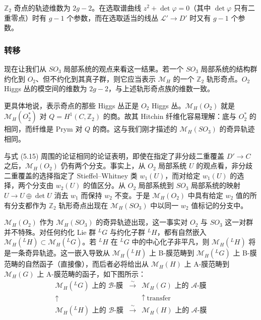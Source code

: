 \documentclass[11pt,a4paper]{article}
\begin{document}
$\mathbb{Z}_2$ 奇点的轨迹维数为 $2g-2$。在选取谱曲线 $z^2+\det\varphi = 0$（其中 $\det\varphi$ 只有二重零点）时有 $g-1$ 个参数，而在选取适当的线丛 $\mathcal{L}'\to D'$ 时又有 $g-1$ 个参数。


\subsubsection{转移}

现在让我们从 $SO_3$ 局部系统的观点来看这一结果。若一个 $SO_3$ 局部系统的结构群约化到 $O_2$、但不约化到其真子群，则它应当表示 $\mathcal{M}_H$ 的一个 $\mathbb{Z}_2$ 轨形奇点。$O_2$ Higgs 丛的模空间的维数为 $2g-2$，与上述轨形奇点族的维数一致。

更具体地说，表示奇点的那些 Higgs 丛正是 $O_2$ Higgs 丛。$\mathcal{M}_H(O_2)$ 就是 $\mathcal{M}_H(O_2^*)$ 对 $Q = H^1(C,\mathbb{Z}_2)$ 的商。故其 Hitchin 纤维化容易理解：底与 $O_2^*$ 的相同，而纤维是 Prym 对 $Q$ 的商。这与我们刚才描述的 $\mathcal{M}_H(SO_3)$ 的奇异轨迹相同。

与式 (5.15) 周围的论证相同的论证表明，即使在指定了非分歧二重覆盖 $D'\to C$ 之后，$\mathcal{M}_H(O_2)$ 仍有两个分支。事实上，从 $O_2$ 局部系统 $U$ 的观点看，非分歧二重覆盖的选择指定了 Stieffel--Whitney 类 $w_1(U)$，而对给定 $w_1(U)$ 的选择，两个分支由 $w_2(U)$ 的值区分。从 $O_2$ 局部系统到 $SO_3$ 局部系统的映射 $U\to U\oplus\det U$ 消去 $w_1$ 而保持 $w_2$ 不变。于是 $\mathcal{M}_H(O_2)$ 中具有给定 $w_2$ 值的所有分支都作为 $\mathbb{Z}_2$ 轨形奇点出现在 $\mathcal{M}_H(SO_3)$ 中以同一 $w_2$ 值标记的分支中。

$\mathcal{M}_H(O_2)$ 作为 $\mathcal{M}_H(SO_3)$ 的奇异轨迹出现，这一事实对 $O_2$ 与 $SO_3$ 这一对群并不特殊。对任何约化 Lie 群 ${}^{L}G$ 与约化子群 ${}^{L}H$，都有自然嵌入 $\mathcal{M}_H({}^{L}H)\subset\mathcal{M}_H({}^{L}G)$。若 ${}^{L}H$ 在 ${}^{L}G$ 中的中心化子非平凡，则 $\mathcal{M}_H({}^{L}H)$ 将是一条奇异轨迹。这一嵌入导致从 $\mathcal{M}_H({}^{L}H)$ 上 B-膜范畴到 $\mathcal{M}_H({}^{L}G)$ 上 B-膜范畴的自然函子（直接像），而后者必将给出从 $\mathcal{M}_H(H)$ 上 A-膜范畴到 $\mathcal{M}_H(G)$ 上 A-膜范畴的函子，如下图所示：
\[
\begin{array}{ccc}
\mathcal{M}_H({}^{L}G)\text{ 上的 }\mathcal{B}\text{-膜} & \xrightarrow{\ \sim\ } & \mathcal{M}_H(G)\text{ 上的 }\mathcal{A}\text{-膜}\\[10pt]
\uparrow & & \uparrow\ \text{transfer}\\[10pt]
\mathcal{M}_H({}^{L}H)\text{ 上的 }\mathcal{B}\text{-膜} & \xrightarrow{\ \sim\ } & \mathcal{M}_H(H)\text{ 上的 }\mathcal{A}\text{-膜}
\end{array}
\]
\end{document}
